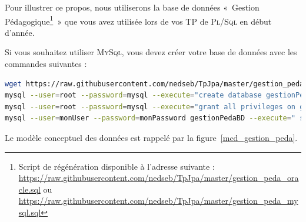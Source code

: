 \documentclass[a4paper,11pt]{article}
\begin{document}
Pour illustrer ce propos, nous utiliserons la base de données «~Gestion 
Pédagogique\footnote{Script de régénération disponible à l'adresse suivante : 
\url{https://raw.githubusercontent.com/nedseb/TpJpa/master/gestion_peda_oracle.sql} ou \url{https://raw.githubusercontent.com/nedseb/TpJpa/master/gestion_peda_mysql.sql}}~» que vous avez 
utilisée lors de vos TP de \textsc{Pl/Sql} en début d'année. 

Si vous souhaitez utiliser \textsc{MySql}, vous devez créer votre base de données avec les commandes suivantes :
\begin{lstlisting}[language=bash]
wget https://raw.githubusercontent.com/nedseb/TpJpa/master/gestion_peda_mysql.sql -O ~/net-home/gestion_peda_mysql.sql
mysql --user=root --password=mysql --execute="create database gestionPedaBD"
mysql --user=root --password=mysql --execute="grant all privileges on gestionPedaBD.* to monUser@localhost identified by 'monPassword'"
mysql --user=monUser --password=monPassword gestionPedaBD --execute=" source ~/net-home/gestion_peda_mysql.sql"
\end{lstlisting}

Le modèle conceptuel des données est rappelé par la figure~\ref{mcd_gestion_peda}.
\end{document}
